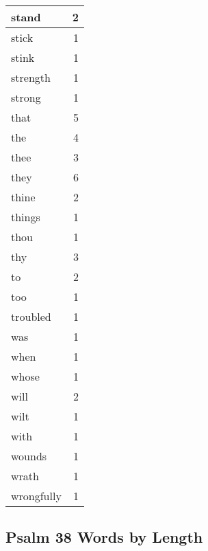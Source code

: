 \begin{center}
\begin{longtable}{l|r}
stand & 2\\ \hline 
stick & 1\\ \hline 
stink & 1\\ \hline 
strength & 1\\ \hline 
strong & 1\\ \hline 
that & 5\\ \hline 
the & 4\\ \hline 
thee & 3\\ \hline 
they & 6\\ \hline 
thine & 2\\ \hline 
things & 1\\ \hline 
thou & 1\\ \hline 
thy & 3\\ \hline 
to & 2\\ \hline 
too & 1\\ \hline 
troubled & 1\\ \hline 
was & 1\\ \hline 
when & 1\\ \hline 
whose & 1\\ \hline 
will & 2\\ \hline 
wilt & 1\\ \hline 
with & 1\\ \hline 
wounds & 1\\ \hline 
wrath & 1\\ \hline 
wrongfully & 1\\ \hline 
\end{longtable}
\end{center}





\subsection{Psalm 38 Words by Length}


\normalsize
 
